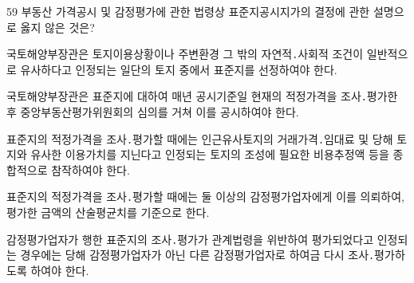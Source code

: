 \begin{question}{59}
부동산 가격공시 및 감정평가에 관한 법령상 표준지공시지가의 결정에 관한 설명으로 옳지 않은 것은?
\begin{choices}
  \item 국토해양부장관은 토지이용상황이나 주변환경 그 밖의 자연적․사회적 조건이 일반적으로 유사하다고 인정되는 일단의 토지 중에서 표준지를 선정하여야 한다.
  \item 국토해양부장관은 표준지에 대하여 매년 공시기준일 현재의 적정가격을 조사․평가한 후 중앙부동산평가위원회의 심의를 거쳐 이를 공시하여야 한다.
  \item 표준지의 적정가격을 조사․평가할 때에는 인근유사토지의 거래가격․임대료 및 당해 토지와 유사한 이용가치를 지닌다고 인정되는 토지의 조성에 필요한 비용추정액 등을 종합적으로 참작하여야 한다.
  \item 표준지의 적정가격을 조사․평가할 때에는 둘 이상의 감정평가업자에게 이를 의뢰하여, 평가한 금액의 산술평균치를 기준으로 한다.
  \item 감정평가업자가 행한 표준지의 조사․평가가 관계법령을 위반하여 평가되었다고 인정되는 경우에는 당해 감정평가업자가 아닌 다른 감정평가업자로 하여금 다시 조사․평가하도록 하여야 한다.
\end{choices}
\end{question}
